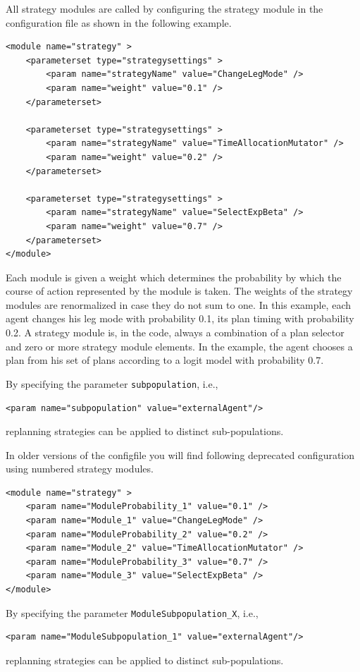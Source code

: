 All strategy modules are called by configuring the strategy module in the configuration file as shown in the following example.
%
\begin{lstlisting}
<module name="strategy" >
	<parameterset type="strategysettings" >
		<param name="strategyName" value="ChangeLegMode" />
		<param name="weight" value="0.1" />
	</parameterset>
	
	<parameterset type="strategysettings" >
		<param name="strategyName" value="TimeAllocationMutator" />
		<param name="weight" value="0.2" />
	</parameterset>
	
	<parameterset type="strategysettings" >
		<param name="strategyName" value="SelectExpBeta" />
		<param name="weight" value="0.7" />
	</parameterset>
</module>
\end{lstlisting}
%
Each module is given a weight which determines the probability by which the course of action represented by the module is taken. The weights of the strategy modules are renormalized in case they do not sum to one. In this example, each agent changes his leg mode with probability 0.1, its plan timing with probability 0.2. A strategy module is, in the code, always a combination of a plan selector and zero or more strategy module elements. In the example, the agent chooses a plan from his set of plans according to a logit model with probability 0.7. 

By specifying the parameter \lstinline|subpopulation|, i.e.,\,\
\begin{lstlisting}
<param name="subpopulation" value="externalAgent"/>
\end{lstlisting}
replanning strategies can be applied to distinct sub-populations.

In older versions of the \gls{configfile} you will find following deprecated configuration using numbered strategy modules.
%
\begin{lstlisting}
<module name="strategy" >
    <param name="ModuleProbability_1" value="0.1" />
    <param name="Module_1" value="ChangeLegMode" />
    <param name="ModuleProbability_2" value="0.2" />
    <param name="Module_2" value="TimeAllocationMutator" />
    <param name="ModuleProbability_3" value="0.7" />
    <param name="Module_3" value="SelectExpBeta" />
</module>
\end{lstlisting}
%
\ah{angepasst}
%
By specifying the parameter \lstinline|ModuleSubpopulation_X|, i.e.,\,
\begin{lstlisting}
<param name="ModuleSubpopulation_1" value="externalAgent"/>
\end{lstlisting}
replanning strategies can be applied to distinct sub-populations.

